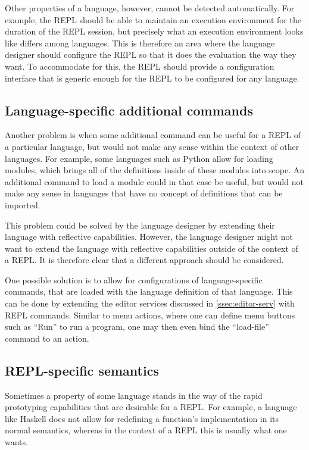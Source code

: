 Other properties of a language, however, cannot be detected
automatically. For example, the REPL should be able to maintain an
execution environment for the duration of the REPL session, but
precisely what an execution environment looks like differs among
languages. This is therefore an area where the language designer
should configure the REPL so that it does the evaluation the way they
want. To accommodate for this, the REPL should provide a configuration
interface that is generic enough for the REPL to be configured
for any language.

\subsection{Language-specific additional commands}
\label{ssec:lang-spec-addit}
Another problem is when some additional command can be useful for a
REPL of a particular language, but would not make any sense within the
context of other languages. For example, some languages such as Python
allow for loading modules, which brings all of the definitions inside
of these modules into scope. An additional command to load a module
could in that case be useful, but would not make any sense in
languages that have no concept of definitions that can be imported.

This problem could be solved by the language designer by extending
their language with reflective capabilities. However, the language
designer might not want to extend the language with reflective
capabilities outside of the context of a REPL. It is therefore clear
that a different approach should be considered.

One possible solution is to allow for configurations of
language-specific commands, that are loaded with the language
definition of that language. This can be done by extending the editor
services discussed in \cref{ssec:editor-serv} with REPL
commands. Similar to menu actions, where one can define menu buttons
such as ``Run'' to run a program, one may then even bind the
``load-file'' command to an action.

\subsection{REPL-specific semantics}
\label{ssec:repl-spec-semant}
Sometimes a property of some language stands in the way of the rapid
prototyping capabilities that are desirable for a REPL. For example, a
language like Haskell does not allow for redefining a function's
implementation in its normal semantics, whereas in the context of a
REPL this is usually what one wants.

